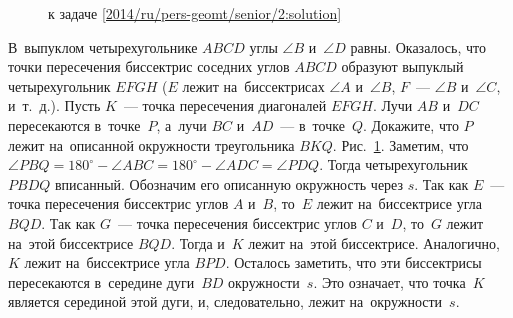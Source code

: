 \ifsolution
\begin{figure}\centering
    \caption{к задаче \ref{2014/ru/pers-geomt/senior/2:solution}}
    \label{2014/ru/pers-geomt/senior/2:solution:fig}
\end{figure}%
\fi %

\problem
В~выпуклом четырехугольнике $ABCD$ углы $\angle B$ и~$\angle D$ равны.
Оказалось, что точки пересечения биссектрис соседних углов $ABCD$ образуют
выпуклый четырехугольник $EFGH$
($E$ лежит на~биссектрисах $\angle A$ и~$\angle B$,
$F$~--- $\angle B$ и~$\angle C$, и~т.~д.).
Пусть $K$~--- точка пересечения диагоналей $EFGH$.
Лучи $AB$ и~$DC$ пересекаются в~точке~$P$, а~лучи $BC$ и~$AD$~--- в~точке~$Q$.
Докажите, что $P$ лежит на~описанной окружности треугольника $BKQ$.
\solution
\label{2014/ru/pers-geomt/senior/2:solution}%
Рис.~\ref{2014/ru/pers-geomt/senior/2:solution:fig}.
Заметим, что
$\angle PBQ = 180^\circ - \angle ABC = 180^\circ - \angle ADC = \angle PDQ$.
Тогда четырехугольник $PBDQ$ вписанный.
Обозначим его описанную окружность через $s$.
Так как $E$~--- точка пересечения биссектрис углов $A$ и~$B$, то~$E$ лежит
на~биссектрисе угла $BQD$.
Так как $G$~--- точка пересечения биссектрис углов $C$ и~$D$, то~$G$ лежит
на~этой биссектрисе $BQD$.
Тогда и~$K$ лежит на~этой биссектрисе.
Аналогично, $K$ лежит на~биссектрисе угла $BPD$.
Осталось заметить, что эти биссектрисы пересекаются в~середине дуги~$BD$
окружности~$s$.
Это означает, что точка~$K$ является серединой этой дуги, и, следовательно,
лежит на~окружности~$s$.
\endproblem
